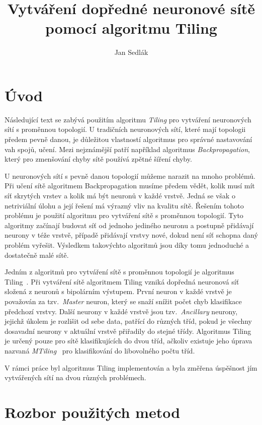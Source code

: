 \documentclass[a4paper, 11pt]{article}
\author{Jan Sedlák}
\title{Vytváření dopředné neuronové sítě pomocí algoritmu Tiling}
\begin{document}
\maketitle
\section*{Úvod}
Následující text se zabývá použitím algoritmu \emph{Tiling} pro vytváření neuronových sítí s proměnnou topologií. U tradičních neuronových sítí, které mají topologii předem pevně danou, je důležitou vlastností algoritmus pro správné nastavování vah spojů, učení. Mezi nejznámější patří například algoritmus \emph{Backpropagation}, který pro zmenšování chyby sítě používá zpětné šíření chyby.

U neuronových sítí s pevně danou topologií můžeme narazit na mnoho problémů. Při učení sítě algoritmem Backpropagation musíme předem vědět, kolik musí mít síť skrytých vrstev a kolik má být neuronů v každé vrstvě. Jedná se však o netriviální úlohu a její řešení má výrazný vliv na kvalitu sítě. Řešením tohoto problému je použití algoritmu pro vytváření sítě s proměnnou topologií. Tyto algoritmy začínají budovat síť od jednoho jediného neuronu a postupně přidávají neurony v téže vrstvě, případě při\-dá\-va\-jí vrstvy nové, dokud není síť schopna daný problém vyřešit. Výsledkem takovýchto algoritmů jsou díky tomu jednoduché a dostatečně malé sítě.

Jedním z algoritmů pro vytváření sítě s proměnnou topologií je algoritmus Tiling~\cite{mezard}. Při vytváření sítě algoritmem Tiling vzniká dopředná neuronová síť složená z neuronů s bipolárním výstupem. První neuron v každé vrstvě je považován za tzv.~\emph{Master} neuron, který se snaží snížit počet chyb klasifikace předchozí vrstvy. Další neurony v každé vrstvě jsou tzv.~\emph{Ancillary} neurony, jejichž úkolem je rozlišit od sebe data, patřící do různých tříd, pokud je všechny dosavadní neurony v aktuální vrstvě přiřadily do stejné třídy. Algoritmus Tiling je určený pouze pro sítě klasifikujících do dvou tříd, ačkoliv existuje jeho úprava nazvaná \emph{MTiling}~\cite{mtiling} pro klasifikování do libovolného počtu tříd.

V rámci práce byl algoritmus Tiling implementován a byla změřena úspěšnost jím vytvářených sítí na dvou různých problémech.

\section*{Rozbor použitých metod}
\end{document}
